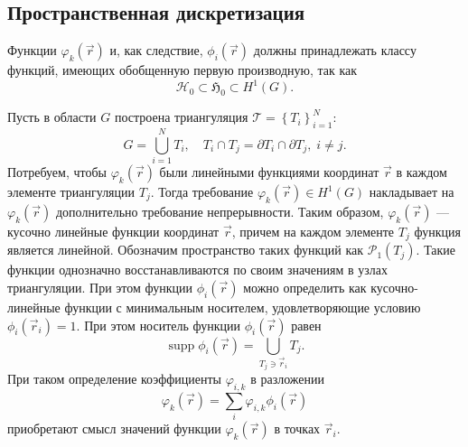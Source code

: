 \subsection{Пространственная дискретизация}

Функции $\varphi_k(\vec r)$ и, как следствие, $\phi_i(\vec r)$ должны принадлежать классу функций, имеющих обобщенную первую производную, так как
\[
\mathcal{H}_0 \subset \mathfrak{H}_0 \subset H^1(G).
\]

Пусть в области $G$ построена триангуляция $\mathcal{T} = \left\{T_i\right\}_{i=1}^N$:
\[
G = \bigcup_{i=1}^{N} T_i, \quad T_i \cap T_j = \partial T_i \cap \partial T_j, \; i \neq j.
\]
Потребуем, чтобы $\varphi_k(\vec r)$ были линейными функциями координат $\vec r$ в каждом элементе триангуляции $T_j$. Тогда требование $\varphi_k(\vec r) \in H^1(G)$ накладывает на $\varphi_k(\vec r)$ дополнительно требование непрерывности. Таким образом, $\varphi_k(\vec r)$ --- кусочно линейные функции координат $\vec r$, причем на каждом элементе $T_j$ функция является линейной. Обозначим пространство таких функций как $\mathcal{P}_1(T_j)$. Такие функции однозначно восстанавливаются по своим значениям в узлах триангуляции. При этом функции $\phi_i(\vec r)$ можно определить как кусочно-линейные функции с минимальным носителем, удовлетворяющие условию $\phi_i(\vec r_i) = 1$. При этом носитель функции $\phi_i(\vec r)$ равен
\[
\operatorname{supp} \phi_i(\vec r) = \bigcup_{T_j \ni \vec r_i } T_j.
\]
При таком определение коэффициенты $\varphi_{i,k}$ в разложении
\[
\varphi_k(\vec r) = \sum_{i} \varphi_{i,k} \phi_i(\vec r)
\]
приобретают смысл значений функции $\varphi_k(\vec r)$ в точках $\vec r_i$.

